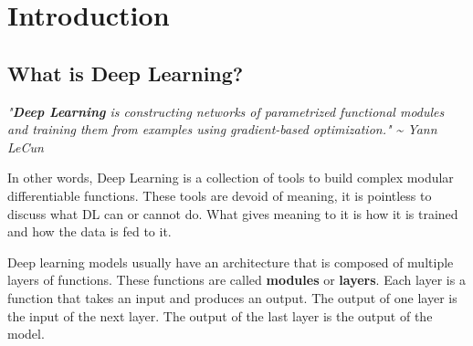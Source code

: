 \chapter{Introduction}

\section{What is Deep Learning?}

\begin{definitionblock}
    \textit{"\textbf{Deep Learning} is constructing networks of parametrized functional modules and training them from examples using gradient-based optimization." \newline
    \phantom{ } \hfill \textasciitilde{} Yann LeCun}
\end{definitionblock}

In other words, Deep Learning is a collection of tools to build complex modular differentiable functions. These tools are devoid of meaning, it is pointless to discuss what DL can or cannot do. What gives meaning to it is how it is trained and how the data is fed to it.

\vspace{0.5em}

Deep learning models usually have an architecture that is composed of multiple layers of functions. These functions are called \textbf{modules} or \textbf{layers}. Each layer is a function that takes an input and produces an output. The output of one layer is the input of the next layer. The output of the last layer is the output of the model.







